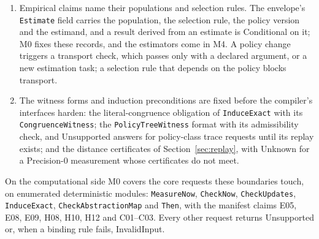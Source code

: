 \documentclass[11pt]{article}
\newcommand{\code}[1]{\texttt{#1}}
\begin{document}
\begin{enumerate}
between goal observers, are results under those names, and preservation of the meaning is a
separate obligation with declared, protected decoders,
$d_{\mathrm{new}}(g_{\mathrm{new}}(x))=d_{\mathrm{old}}(g_{\mathrm{old}}(x))$ for every valid record $x$;
a goal change counts as a renaming only when both hold. The adequacy checks are the
\code{CheckNow} requests of M0. The interpretation request, \code{CheckInterpretation} of the Omega
memory and goals guide, is built with the deterministic core in M2, once its registry patch is
adopted.
\item Empirical claims name their populations and selection rules. The envelope's \code{Estimate}
field carries the population, the selection rule, the policy version and the estimand, and a result
derived from an estimate is Conditional on it; M0 fixes these records, and the estimators come in
M4. A policy change triggers a
transport check, which passes only with a declared argument, or a new estimation task; a selection
rule that depends on the policy blocks transport.
\item The witness forms and induction preconditions are fixed before the compiler's interfaces
harden: the literal-congruence obligation of \code{InduceExact} with its
\code{CongruenceWitness}; the \code{PolicyTreeWitness} format with its admissibility check, and
Unsupported answers for policy-class trace requests until its replay exists; and the distance
certificates of Section~\ref{sec:replay}, with Unknown for a Precision-0 measurement whose
certificates do not meet.
\end{enumerate}
On the computational side M0 covers the core requests these boundaries touch, on enumerated
deterministic modules: \code{MeasureNow}, \code{CheckNow}, \code{CheckUpdates}, \code{InduceExact},
\code{CheckAbstractionMap} and \code{Then}, with the manifest claims E05, E08, E09, H08, H10, H12 and
C01--C03. Every other request returns Unsupported or, when a binding rule fails, InvalidInput.
\end{document}
